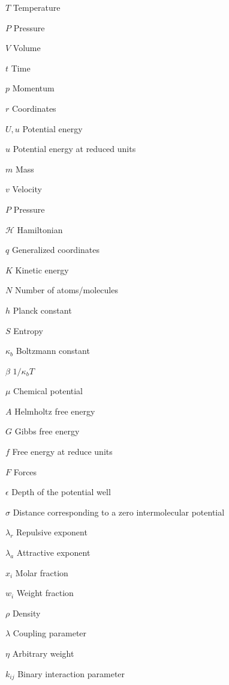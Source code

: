 \documentclass[
	12pt,				%
	openany,			%
	oneside,			%
	a4paper,			%
	english,			%
	brazil				%
	]{abntex2}
\begin{document}
\listoftables*
\cleardoublepage

\begin{simbolos}
  \item[$T$] Temperature
  \item[$P$] Pressure
  \item[$V$] Volume
  \item[$t$] Time
  \item[$p$] Momentum
  \item[$r$] Coordinates
  \item[$U,u$] Potential energy
  \item[$u$] Potential energy at reduced units
  \item[$m$] Mass
  \item[$v$] Velocity
  \item[$P$] Pressure
  \item[$ \mathcal{H} $] Hamiltonian
  \item[$q$] Generalized coordinates
  \item[$K $] 	Kinetic energy 
  \item[$N$] Number of atoms/molecules
  \item[$h$] Planck constant
  \item[$S$] Entropy
  \item[$\kappa_{b}$] Boltzmann constant
  \item[$\beta$] $1/\kappa_{b}T$
  \item[$\mu$] Chemical potential
  \item[$A$] Helmholtz free energy
  \item[$G$] Gibbs free energy
  \item[$f$] Free energy at reduce units
  \item[$F$] Forces
  \item[$\epsilon$] Depth of the potential well
  \item[$\sigma$] Distance corresponding to a zero intermolecular potential
  \item[$\lambda _{r}$] Repulsive exponent
  \item[$\lambda _{a}$] Attractive exponent
  \item[$x_{i}$] Molar fraction 
  \item[$w_{i}$] Weight fraction 
  \item[$\rho$] Density
  \item[$\lambda$] Coupling parameter 
  \item[$\eta$] Arbitrary weight 
  \item[$k_{ij}$] Binary interaction parameter
\end{simbolos}
\end{document}
